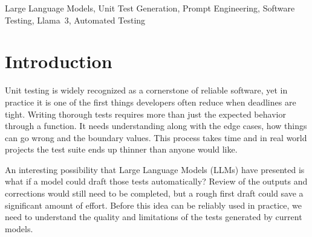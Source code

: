 \documentclass[conference]{IEEEtran}
\begin{document}
\begin{abstract}
 In this paper, we examine whether a large language model can take some of the burden of writing unit tests by hand. This is one of the most time consuming parts of software development, so we are trying to solve this by automatically generating pytest-style unit tests for Python functions. The end-to-end pipeline we built pulls real-world functions from the pyMethods2Test dataset and feeds them to the Llama~3 model through Ollama, which generates a total of 300 tests. This then evaluates whatever the model produces. To examine how prompt design affects results three different prompting strategies were used. These were a simple baseline, a context-enriched prompt, and a fully structured advanced prompt. We then compared the tests that each of these generated. The advanced prompt led to an average of 9.38 assertions per test and edge-case coverage across every sample based on keyword detection. The experiment also made the current limits of LLM-generated code hard to disregard. The results showed 53\% of the generated tests were syntactically valid Python, and 47\%  contained syntax errors. These findings suggest that large language models are a genuinely useful starting point for test generation, but they are not yet a replacement for human review and post-processing.
\end{abstract}

\begin{IEEEkeywords}
Large Language Models, Unit Test Generation, Prompt Engineering, Software Testing, Llama~3, Automated Testing
\end{IEEEkeywords}

\section{Introduction}

Unit testing is widely recognized as a cornerstone of reliable software, yet in practice it is one of the first things developers often reduce when deadlines are tight. Writing thorough tests requires more than just the expected behavior through a function. It needs understanding along with the edge cases, how things can go wrong and the boundary values. This process takes time and in real world projects the test suite ends up thinner than anyone would like.

 An interesting possibility that Large Language Models (LLMs) have presented is what if a model could draft those tests automatically? Review of the outputs and corrections would still need to be completed, but a rough first draft could save a significant amount of effort. Before this idea can be reliably used in practice, we need to understand the quality and limitations of the tests generated by current models.
\end{document}
